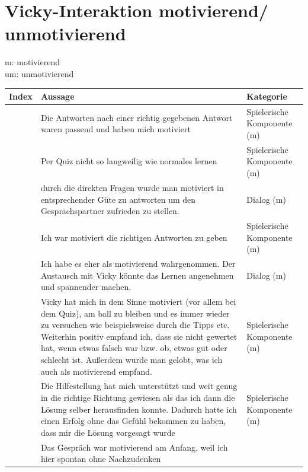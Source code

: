 \pagebreak

\section{Vicky-Interaktion motivierend/ unmotivierend}\label{tab:/VIMUM} 

m: motivierend\\
um: unmotivierend 
\begingroup
\footnotesize 
\begin{longtable}{|m{2cm}|m{7cm}|m{6cm}|}
  \hline
    \rowcolor[HTML]{EFEFEF} 
    \centering \textbf{Index} &\centering \textbf{Aussage} & \centering \arraybackslash  \textbf{Kategorie} \\    \hline \hline
    \centering  \arraybackslash  1 & Die Antworten nach einer richtig gegebenen Antwort waren passend und haben mich motiviert & Spielerische Komponente (m)  \\ \hline
    \centering  \arraybackslash  2 & Per Quiz nicht so langweilig wie normales lernen& Spielerische Komponente (m)   \\ \hline
    \centering  \arraybackslash  3 & durch die direkten Fragen wurde man motiviert in entsprechender Güte zu antworten um den Gesprächspartner zufrieden zu stellen.& Dialog (m)   \\ \hline
    \centering  \arraybackslash  4 & Ich war motiviert die richtigen Antworten zu geben							 & Spielerische Komponente (m)   \\ \hline
    \centering  \arraybackslash  5 & Ich habe es eher als motivierend wahrgenommen. Der Austausch mit Vicky könnte das Lernen angenehmen und spannender machen. 							 &  Dialog (m)   \\ \hline
    \centering  \arraybackslash  6 &Vicky hat mich in dem Sinne motiviert (vor allem bei dem Quiz), am ball zu bleiben und es immer wieder zu versuchen
     wie beispielsweise durch die Tipps etc. Weiterhin positiv empfand ich, dass sie nicht gewertet hat, wenn etwas falsch war bzw. ob, etwas gut oder schlecht ist. 
      Außerdem wurde man gelobt, was ich auch als motivierend empfand. 							  & Spielerische Komponente (m)  \\ \hline
    \centering  \arraybackslash  7 & Die Hilfestellung hat mich unterstützt und weit genug in die richtige Richtung gewiesen als das ich dann die Lösung selber
     herausfinden konnte. Dadurch hatte ich einen Erfolg ohne das Gefühl bekommen zu haben, dass mir die Lösung vorgesagt wurde													 &  Spielerische Komponente (m)  \\ \hline
    \centering  \arraybackslash  8 & Das Gespräch war motivierend am Anfang, weil ich hier spontan ohne Nachzudenken   

\end{longtable}
